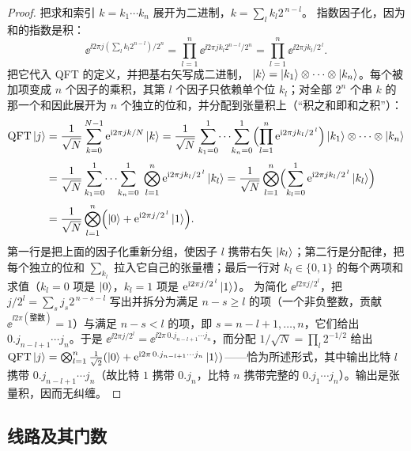 \begin{proof}
把求和索引 $k=k_1\cdots k_n$ 展开为二进制，$k=\sum_l k_l 2^{\,n-l}$。
指数因子化，因为和的指数是积：
\[
  \ee^{\ii 2\pi j(\sum_l k_l 2^{n-l})/2^{n}}
   =\prod_{l=1}^{n}\ee^{\ii 2\pi j k_l 2^{n-l}/2^{n}}
   =\prod_{l=1}^{n}\ee^{\ii 2\pi j k_l/2^{\,l}}.
\]
把它代入 QFT 的定义，并把基右矢写成二进制，
$\ket{k}=\ket{k_1}\otimes\cdots\otimes\ket{k_n}$。每个被加项变成 $n$ 个因子的乘积，其第 $l$ 个因子只依赖单个位 $k_l$；对全部 $2^{n}$ 个串 $k$ 的那一个和因此展开为 $n$ 个独立的位和，并分配到张量积上（``积之和即和之积''）：
\[
\begin{aligned}
  \mathrm{QFT}\ket{j}
   &=\frac{1}{\sqrt N}\sum_{k=0}^{N-1}\mathrm{e}^{\mathrm{i} 2\pi jk/N}\ket{k}
    =\frac{1}{\sqrt N}\sum_{k_1=0}^{1}\!\cdots\!\sum_{k_n=0}^{1}
       \Bigl(\prod_{l=1}^{n}\mathrm{e}^{\mathrm{i} 2\pi j k_l/2^{\,l}}\Bigr)
       \ket{k_1}\otimes\cdots\otimes\ket{k_n}\\[2pt]
   &=\frac{1}{\sqrt N}\sum_{k_1=0}^{1}\!\cdots\!\sum_{k_n=0}^{1}\;
       \bigotimes_{l=1}^{n}\mathrm{e}^{\mathrm{i} 2\pi j k_l/2^{\,l}}\ket{k_l}
    =\frac{1}{\sqrt N}\bigotimes_{l=1}^{n}
       \Bigl(\sum_{k_l=0}^{1}\mathrm{e}^{\mathrm{i} 2\pi j k_l/2^{\,l}}\ket{k_l}\Bigr)\\[2pt]
   &=\frac{1}{\sqrt N}\bigotimes_{l=1}^{n}
       \Bigl(\ket{0}+\mathrm{e}^{\mathrm{i} 2\pi j/2^{\,l}}\ket{1}\Bigr).
\end{aligned}
\]
第一行是把上面的因子化重新分组，使因子 $l$ 携带右矢 $\ket{k_l}$；第二行是分配律，把每个独立的位和 $\sum_{k_l}$ 拉入它自己的张量槽；最后一行对 $k_l\in\{0,1\}$ 的每个两项和求值（$k_l=0$ 项是 $\ket{0}$，$k_l=1$ 项是
$\mathrm{e}^{\mathrm{i} 2\pi j/2^{\,l}}\ket{1}$）。
为简化 $\ee^{\ii 2\pi j/2^{l}}$，把 $j/2^{l}=\sum_{s}j_s 2^{\,n-s-l}$ 写出并拆分为满足 $n-s\ge l$ 的项（一个非负整数，贡献
$\ee^{\ii 2\pi(\text{整数})}=1$）与满足 $n-s<l$ 的项，即
$s=n-l+1,\dots,n$，它们给出 $0.j_{n-l+1}\cdots j_n$。于是
$\ee^{\ii 2\pi j/2^{l}}=\ee^{\ii 2\pi\,0.j_{n-l+1}\cdots j_n}$，而分配
$1/\sqrt N=\prod_l 2^{-1/2}$ 给出
$\mathrm{QFT}\ket{j}=\bigotimes_{l=1}^{n}\tfrac{1}{\sqrt2}(\ket{0}
+\mathrm{e}^{\mathrm{i} 2\pi\,0.j_{n-l+1}\cdots j_n}\ket{1})$——恰为所述形式，其中输出比特 $l$ 携带 $0.j_{n-l+1}\cdots j_n$（故比特 $1$ 携带 $0.j_n$，比特 $n$ 携带完整的 $0.j_1\cdots j_n$）。输出是张量积，因而无纠缠。
\end{proof}
\subsection*{线路及其门数}

